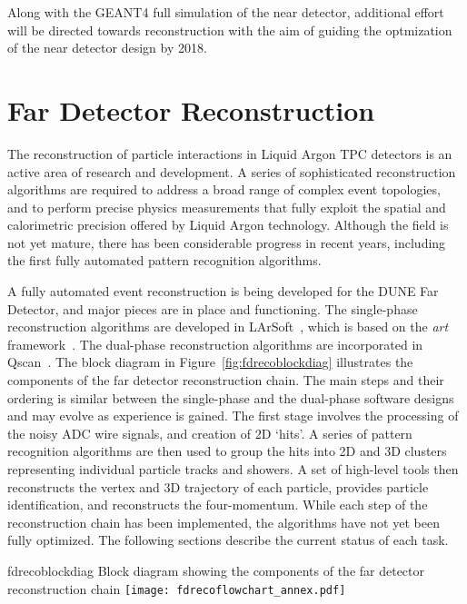 Along with the GEANT4 full simulation of the near detector, additional effort will be directed
towards reconstruction with the aim of guiding the optmization of the near detector design by 2018.

\section{Far Detector Reconstruction}
\label{annex:detectors-sc-physics-software-reconstruction-fd}

The reconstruction of particle interactions in Liquid Argon TPC
detectors is an active area of research and development.
A series of sophisticated reconstruction algorithms are required to
address a broad range of complex event topologies, and to perform
precise physics measurements that fully exploit the spatial and 
calorimetric precision offered by Liquid Argon technology.
Although the field is not yet mature, there has been considerable
progress in recent years, including the first fully automated
pattern recognition algorithms. 

A fully automated event reconstruction is being developed for the
DUNE Far Detector, and major pieces are in place and functioning.
The single-phase reconstruction algorithms are developed in LArSoft~\cite{Church:2013hea},
which is based on the {\it art} framework~\cite{Green:2012gv}.  The dual-phase reconstruction
algorithms are incorporated in Qscan~\cite{lussi:thesis}.
The block diagram in Figure~\ref{fig:fdrecoblockdiag}
illustrates the components of the far detector reconstruction chain.  The main steps and
their ordering is similar between the single-phase and the dual-phase software designs
and may evolve as experience is gained. 
The first stage involves the processing of the noisy ADC wire signals,
and creation of 2D `hits'. A series of pattern recognition algorithms
are then used to group the hits into 2D and 3D clusters representing 
individual particle tracks and showers. A set of high-level tools
then reconstructs the vertex and 3D trajectory of each particle,
provides particle identification, and reconstructs the four-momentum.
While each step of the reconstruction chain has been implemented,
the algorithms have not yet been fully optimized.
The following sections describe the current status of each task.

\begin{cdrfigure}{fdrecoblockdiag}
{Block diagram showing the components of the far detector reconstruction chain}
\texttt{[image: fdrecoflowchart\_annex.pdf]}
\end{cdrfigure}


